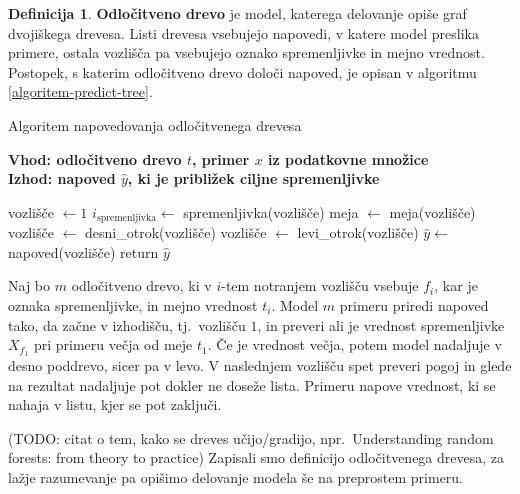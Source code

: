 \documentclass[12pt,a4paper,twoside]{article}
\theoremstyle{definition} %
\newtheorem{definicija}{Definicija}[section]
\theoremstyle{plain} %
\numberwithin{equation}{section}  %
\begin{document}
\begin{definicija} 
\textbf{Odločitveno drevo} je model, katerega delovanje opiše graf dvojiškega drevesa. 
Listi drevesa vsebujejo napovedi, v katere model preslika primere, ostala vozlišča pa vsebujejo oznako spremenljivke in mejno vrednost. 
Postopek, s katerim odločitveno drevo določi napoved, je opisan v algoritmu \ref{algoritem-predict-tree}.

\begin{algorithm}[ht]
  \caption{Algoritem napovedovanja odločitvenega drevesa}
  \label{algoritem-predict-tree}
  \raggedright
  \textbf{Vhod: odločitveno drevo $t$, primer $x$ iz podatkovne množice}  \\
  \textbf{Izhod: napoved $\hat{y}$, ki je približek ciljne spremenljivke} 
  \begin{algorithmic}[0]
	\State vozlišče $\gets 1$
	   
		\State $i_{\mathrm{spremenljivka}} \gets$ spremenljivka(vozlišče)
		\State meja $\gets$ meja(vozlišče)
			\State vozlišče $\gets$ desni\_otrok(vozlišče)
		\Else
			\State vozlišče $\gets$ levi\_otrok(vozlišče)
		\EndIf
	\EndWhile
	\State $\hat{y} \gets$ napoved(vozlišče)   
	\State return $\hat{y}$
  \end{algorithmic}
\end{algorithm}

Naj bo $m$ odločitveno drevo, ki v $i$-tem notranjem vozlišču vsebuje $f_i$, kar je oznaka spremenljivke, in mejno vrednost $t_i$. 
Model $m$ primeru priredi napoved tako, da začne v izhodišču, tj.~vozlišču $1$, in preveri ali je vrednost spremenljivke $X_{f_1}$ pri primeru večja od meje $t_1$. 
Če je vrednost večja, potem model nadaljuje v desno poddrevo, sicer pa v levo. 
V naslednjem vozlišču spet preveri pogoj in glede na rezultat nadaljuje pot dokler ne doseže lista. 
Primeru napove vrednost, ki se nahaja v listu, kjer se pot zaključi.

\end{definicija}

(TODO: citat o tem, kako se dreves učijo/gradijo, npr.\ Understanding random forests: from theory to practice)
Zapisali smo definicijo odločitvenega drevesa, za lažje razumevanje pa opišimo delovanje modela še na preprostem primeru.
\end{document}
